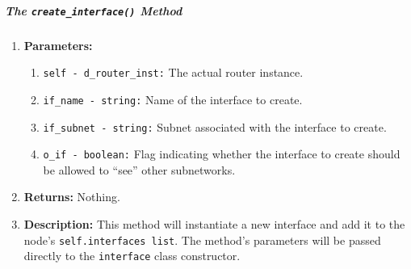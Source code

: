         \subparagraph{The \texttt{create\_interface()} Method}
            \begin{enumerate}
                \item \textbf{Parameters:}
                \begin{enumerate}
                    \item \texttt{self - d\_router\_inst:} The actual router instance.
                    \item \texttt{if\_name - string:} Name of the interface to create.
                    \item \texttt{if\_subnet - string:} Subnet associated with the interface to create.
                    \item \texttt{o\_if - boolean:} Flag indicating whether the interface to create should be allowed to ``see'' other subnetworks.
                \end{enumerate}
                \item \textbf{Returns:} Nothing.
                \item \textbf{Description:} This method will instantiate a new interface and add it to the node's \texttt{self.interfaces list}. The method's parameters will be passed directly to the \texttt{interface} class constructor.
            \end{enumerate}

